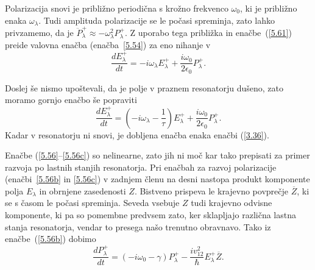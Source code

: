 Polarizacija snovi je približno periodična s krožno frekvenco $\omega_0$, 
ki je približno enaka $\omega_\lambda$.
Tudi amplituda polarizacije se le počasi spreminja, zato lahko privzamemo, da je 
$\ddot{P}_{\lambda}^+ \approx - \omega_\lambda^2 P_{\lambda}^+$. Z uporabo tega
približka in enačbe~(\ref{5.61}) preide valovna enačba (enačba~\ref{5.54}) za eno nihanje v 
\begin{equation}  
\label{5.62}
\frac{dE_{\lambda}^+}{dt}=-i \omega_{\lambda} E_{\lambda}^++
\frac{i \omega_0}{2\epsilon_0}P_{\lambda}^+.
\end{equation}

Doslej še nismo upoštevali, da je polje v praznem resonatorju dušeno, zato
moramo gornjo enačbo še popraviti
\begin{equation}  
\label{5.63}
\frac{dE_{\lambda}^+}{dt}=\left(-i \omega_{\lambda}-\frac{1}{\tau}\right) E_{\lambda}^+ 
+\frac{i \omega_0}{2\epsilon_0}P_{\lambda}^+.
\end{equation}
Kadar v resonatorju ni snovi, je dobljena enačba enaka enačbi (\ref{3.36}).

Enačbe (\ref{5.56}--\ref{5.56c}) so nelinearne, zato jih ni moč kar tako
prepisati za primer razvoja po lastnih stanjih resonatorja. Pri enačbah za
razvoj polarizacije (enačbi~\ref{5.56b} in \ref{5.56c}) v zadnjem členu na desni 
nastopa produkt komponente polja $E_{\lambda}$ in obrnjene zasedenosti $Z$. Bistveno
prispeva le krajevno povprečje $\overline{Z}$, ki se s časom le počasi spreminja.
Seveda vsebuje $Z$ tudi krajevno odvisne komponente, ki pa so pomembne 
predvsem zato, ker sklapljajo različna lastna stanja resonatorja, vendar to
presega našo trenutno obravnavo. Tako iz enačbe~(\ref{5.56b}) dobimo
\begin{equation}  
\label{5.64}
\frac{d P_\lambda^+}{dt}=\left(-i \omega_0-\gamma\right)P_\lambda^{+}-\frac{iv_{12}^2}{\hbar} E_\lambda^+ \overline{Z}.
\end{equation}


